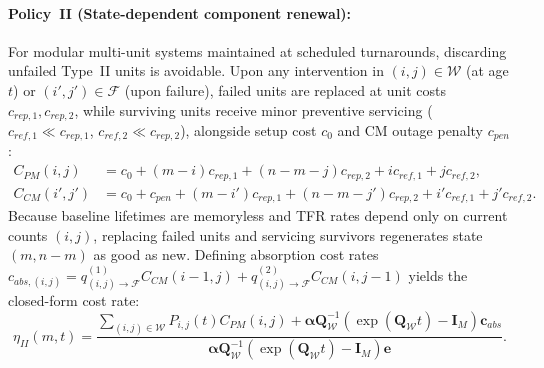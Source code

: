 \documentclass{elektr}
\begin{document}
\paragraph{Policy~II (State-dependent component renewal):} For modular multi-unit systems maintained at scheduled turnarounds, discarding unfailed Type~II units is avoidable. Upon any intervention in $(i, j) \in \mathcal{W}$ (at age $t$) or $(i', j') \in \mathcal{F}$ (upon failure), failed units are replaced at unit costs $c_{rep,1}, c_{rep,2}$, while surviving units receive minor preventive servicing ($c_{ref,1} \ll c_{rep,1}$, $c_{ref,2} \ll c_{rep,2}$), alongside setup cost $c_0$ and CM outage penalty $c_{pen}$:
\begin{align}
C_{PM}(i, j) &= c_0 + (m - i) c_{rep,1} + (n - m - j) c_{rep,2} + i c_{ref,1} + j c_{ref,2}, \label{eq:CPM} \\
C_{CM}(i', j') &= c_0 + c_{pen} + (m - i') c_{rep,1} + (n - m - j') c_{rep,2} + i' c_{ref,1} + j' c_{ref,2}. \label{eq:CCM}
\end{align}
Because baseline lifetimes are memoryless and TFR rates depend only on current counts $(i, j)$, replacing failed units and servicing survivors regenerates state $(m, n-m)$ as good as new. Defining absorption cost rates $c_{abs,(i,j)} = q_{(i,j)\to\mathcal{F}}^{(1)} C_{CM}(i-1, j) + q_{(i,j)\to\mathcal{F}}^{(2)} C_{CM}(i, j-1)$ yields the closed-form cost rate:
\begin{equation}
\eta_{II}(m, t) = \frac{\sum_{(i,j) \in \mathcal{W}} P_{i,j}(t) C_{PM}(i, j) + \boldsymbol{\alpha}\mathbf{Q}_{\mathcal{W}}^{-1}\left(\exp(\mathbf{Q}_{\mathcal{W}} t) - \mathbf{I}_M\right)\mathbf{c}_{abs}}{\boldsymbol{\alpha} \mathbf{Q}_{\mathcal{W}}^{-1} \left( \exp(\mathbf{Q}_{\mathcal{W}} t) - \mathbf{I}_M \right) \mathbf{e}}.
\label{eq:etaII}
\end{equation}
\end{document}
